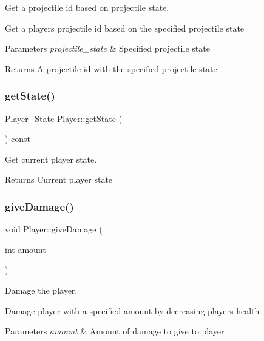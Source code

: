 Get a projectile id based on projectile state. 

Get a player\textquotesingle{}s projectile id based on the specified projectile state 
\begin{DoxyParams}{Parameters}
{\em projectile\+\_\+state} & Specified projectile state \\
\hline
\end{DoxyParams}
\begin{DoxyReturn}{Returns}
A projectile id with the specified projectile state 
\end{DoxyReturn}
\mbox{\label{classPlayer_a37a57d7d3ee9e4a1a6376ac54bb71642}} 
\subsubsection{\texorpdfstring{get\+State()}{getState()}}
{\footnotesize\ttfamily Player\+\_\+\+State Player\+::get\+State (\begin{DoxyParamCaption}{ }\end{DoxyParamCaption}) const}



Get current player state. 

\begin{DoxyReturn}{Returns}
Current player state 
\end{DoxyReturn}
\mbox{\label{classPlayer_acfc10fe38c7a5c41b201c2f29c23d544}} 
\subsubsection{\texorpdfstring{give\+Damage()}{giveDamage()}}
{\footnotesize\ttfamily void Player\+::give\+Damage (\begin{DoxyParamCaption}\item[{int}]{amount }\end{DoxyParamCaption})}



Damage the player. 

Damage player with a specified amount by decreasing player\textquotesingle{}s health 
\begin{DoxyParams}{Parameters}
{\em amount} & Amount of damage to give to player \\
\hline
\end{DoxyParams}
\mbox{\label{classPlayer_a8ad2d6057db638b755b89347fbce25bb}} 
